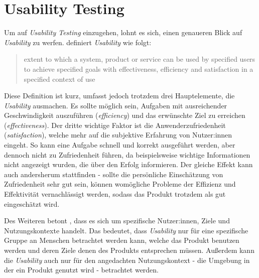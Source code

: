 \section{Usability Testing}

Um auf \textit{Usability Testing} einzugehen, lohnt es sich, einen genaueren Blick auf
\textit{Usability} zu werfen.  definiert \textit{Usability} wie
folgt:
\begin{quote}
  extent to which a system, product or service can be used by specified users to achieve specified
  goals with effectiveness, efficiency and satisfaction in a specified context of use
  \hspace*{\fill{}}
\end{quote}
Diese Definition ist kurz, umfasst jedoch trotzdem drei Hauptelemente, die \textit{Usability}
ausmachen. Es sollte möglich sein, Aufgaben mit ausreichender Geschwindigkeit auszuführen
(\textit{efficiency}) und das erwünschte Ziel zu erreichen (\textit{effectiveness}). Der dritte
wichtige Faktor ist die Anwenderzufriedenheit (\textit{satisfaction}), welche mehr auf die
subjektive Erfahrung von Nutzer:innen eingeht. So kann eine Aufgabe schnell und korrekt ausgeführt
werden, aber dennoch nicht zu Zufriedenheit führen, da beispielsweise wichtige Informationen nicht
angezeigt wurden, die über den Erfolg informieren. Der gleiche Effekt kann auch andersherum
stattfinden - sollte die persönliche Einschätzung von Zufriedenheit sehr gut sein, können womögliche
Probleme der Effizienz und Effektivität vernachlässigt werden, sodass das Produkt trotzdem als gut
eingeschätzt wird. \parencite{barnumUsabilityTesting2021}

Des Weiteren betont \citeauthor{barnumUsabilityTesting2021} \cite{barnumUsabilityTesting2021}, dass
es sich um spezifische Nutzer:innen, Ziele und Nutzungskontexte handelt. Das bedeutet, dass
\textit{Usability} nur für eine spezifische Gruppe an Menschen betrachtet werden kann, welche das
Produkt benutzen werden und deren Ziele denen des Produkts entsprechen müssen. Außerdem kann die
\textit{Usability} auch nur für den angedachten Nutzungskontext - die Umgebung in der ein Produkt
genutzt wird - betrachtet werden. \parencite{barnumUsabilityTesting2021}

